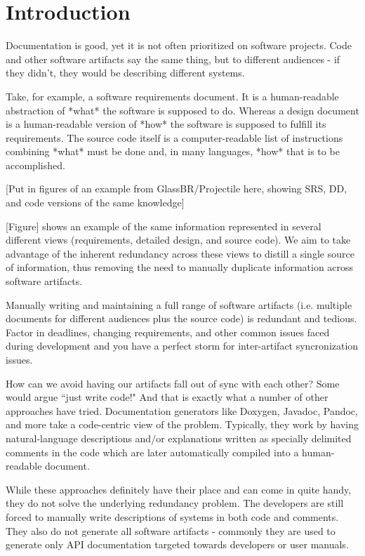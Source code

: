 \chapter{Introduction}

Documentation is good\citep{??}, yet it is not often prioritized on software
projects. Code and other software artifacts say the same thing, but to different
audiences - if they didn't, they would be describing different systems.

Take, for example, a software requirements document. It is a human-readable
abstraction of *what* the software is supposed to do. Whereas a design document
is a human-readable version of *how* the software is supposed to fulfill its
requirements. The source code itself is a computer-readable list of instructions
combining *what* must be done and, in many languages, *how* that is to be
accomplished.

[Put in figures of an example from GlassBR/Projectile here, showing SRS, DD, and
code versions of the same knowledge]

[Figure] shows an example of the same information represented in several
different views (requirements, detailed design, and source code). We aim to
take advantage of the inherent redundancy across these views to distill a single
source of information, thus removing the need to manually duplicate information
across software artifacts.

Manually writing and maintaining a full range of software artifacts (i.e.
multiple documents for different audiences plus the source code) is
redundant and tedious. Factor in deadlines, changing requirements, and other
common issues faced during development and you have a perfect storm for
inter-artifact syncronization issues.

How can we avoid having our artifacts fall out of sync with each other?
Some would argue ``just write code!" And that is exactly what a number of other
approaches have tried. Documentation generators like Doxygen, Javadoc, Pandoc,
and more take a code-centric view of the problem. Typically, they work by having
natural-language descriptions and/or explanations written as specially delimited
comments in the code which are later automatically compiled into a
human-readable document.

While these approaches definitely have their place and can come in quite handy,
they do not solve the underlying redundancy problem. The developers are still
forced to manually write descriptions of systems in both code and comments.
They also do not generate all software artifacts - commonly they are used to
generate only API documentation targeted towards developers or user manuals.

